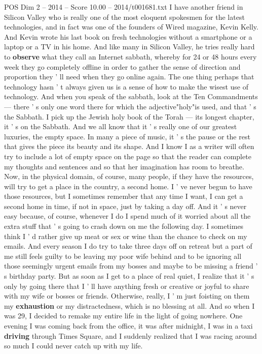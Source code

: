 \begin{textsample}{POS Dim 2 – 2014 – Score 10.00 – 2014/t001681.txt}
I have another friend in Silicon Valley who is really one of the most eloquent spokesmen for the latest technologies, and in fact was one of the founders of Wired magazine, Kevin Kelly.
And Kevin wrote his last book on fresh technologies without a smartphone or a laptop or a TV in his home.
And like many in Silicon Valley, he tries really hard to \textbf{observe} what they call an Internet sabbath, whereby for 24 or 48 hours every week they go completely offline in order to gather the sense of direction and proportion they ' ll need when they go online again.
The one thing perhaps that technology hasn ' t always given us is a sense of how to make the wisest use of technology.
And when you speak of the sabbath, look at the Ten Commandments — there ' s only one word there for which the adjective"holy"is used, and that ' s the Sabbath.
I pick up the Jewish holy book of the Torah — its longest chapter, it ' s on the Sabbath.
And we all know that it ' s really one of our greatest luxuries, the empty space.
In many a piece of music, it ' s the pause or the rest that gives the piece its beauty and its shape.
And I know I as a writer will often try to include a lot of empty space on the page so that the reader can complete my thoughts and sentences and so that her imagination has room to breathe.
Now, in the physical domain, of course, many people, if they have the resources, will try to get a place in the country, a second home.
I ' ve never begun to have those resources, but I sometimes remember that any time I want, I can get a second home in time, if not in space, just by taking a day off.
And it ' s never easy because, of course, whenever I do I spend much of it worried about all the extra stuff that ' s going to crash down on me the following day.
I sometimes think I ' d rather give up meat or sex or wine than the chance to check on my emails.
And every season I do try to take three days off on retreat but a part of me still feels guilty to be leaving my poor wife behind and to be ignoring all those seemingly urgent emails from my bosses and maybe to be missing a friend ' s birthday party.
But as soon as I get to a place of real quiet, I realize that it ' s only by going there that I ' ll have anything fresh or creative or joyful to share with my wife or bosses or friends.
Otherwise, really, I ' m just foisting on them my \textbf{exhaustion} or my distractedness, which is no blessing at all.
And so when I was 29, I decided to remake my entire life in the light of going nowhere.
One evening I was coming back from the office, it was after midnight, I was in a taxi \textbf{driving} through Times Square, and I suddenly realized that I was racing around so much I could never catch up with my life.

\end{textsample}
